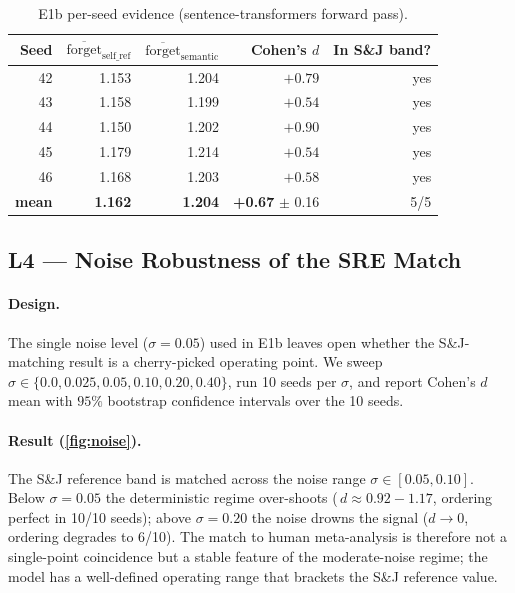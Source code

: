 \begin{table}[ht!]
\centering\small
\caption{E1b per-seed evidence (sentence-transformers forward pass).}
\label{tab:e1b-perseed}
\begin{tabular}{r r r r r}
\toprule
Seed & $\overline{\mathrm{forget}}_{\text{self\_ref}}$ &
$\overline{\mathrm{forget}}_{\text{semantic}}$ & Cohen's $d$ &
In S\&J band? \\
\midrule
42 & 1.153 & 1.204 & $+0.79$ & yes \\
43 & 1.158 & 1.199 & $+0.54$ & yes \\
44 & 1.150 & 1.202 & $+0.90$ & yes \\
45 & 1.179 & 1.214 & $+0.54$ & yes \\
46 & 1.168 & 1.203 & $+0.58$ & yes \\
\midrule
\textbf{mean} & \textbf{1.162} & \textbf{1.204} & \textbf{+0.67}
$\pm$ 0.16 & 5/5 \\
\bottomrule
\end{tabular}
\end{table}

\subsection{L4 --- Noise Robustness of the SRE Match}
\label{sec:exp:noise}

\paragraph{Design.}
The single noise level ($\sigma=0.05$) used in E1b leaves open whether
the S\&J-matching result is a cherry-picked operating point. We sweep
$\sigma \in \{0.0, 0.025, 0.05, 0.10, 0.20, 0.40\}$, run 10 seeds per
$\sigma$, and report Cohen's $d$ mean with $95\%$ bootstrap confidence
intervals over the 10 seeds.

\paragraph{Result (\cref{fig:noise}).}
The S\&J reference band is matched across the noise range
$\sigma \in [0.05, 0.10]$. Below $\sigma=0.05$ the deterministic
regime over-shoots (\,$d \approx 0.92{-}1.17$, ordering perfect in
10/10 seeds); above $\sigma=0.20$ the noise drowns the signal
($d \to 0$, ordering degrades to 6/10). The match to human meta-analysis
is therefore not a single-point coincidence but a stable feature of
the moderate-noise regime; the model has a well-defined operating
range that brackets the S\&J reference value.

